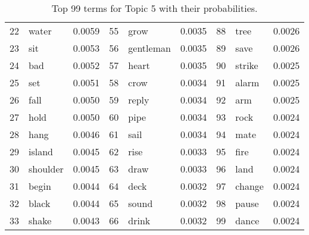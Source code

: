\begin{table}[ht]
\begin{tabular}{rlrrlrrlr}
  22 & water & 0.0059 & 55 & grow & 0.0035 & 88 & tree & 0.0026 \\ 
  23 & sit & 0.0053 & 56 & gentleman & 0.0035 & 89 & save & 0.0026 \\ 
  24 & bad & 0.0052 & 57 & heart & 0.0035 & 90 & strike & 0.0025 \\ 
  25 & set & 0.0051 & 58 & crow & 0.0034 & 91 & alarm & 0.0025 \\ 
  26 & fall & 0.0050 & 59 & reply & 0.0034 & 92 & arm & 0.0025 \\ 
  27 & hold & 0.0050 & 60 & pipe & 0.0034 & 93 & rock & 0.0024 \\ 
  28 & hang & 0.0046 & 61 & sail & 0.0034 & 94 & mate & 0.0024 \\ 
  29 & island & 0.0045 & 62 & rise & 0.0033 & 95 & fire & 0.0024 \\ 
  30 & shoulder & 0.0045 & 63 & draw & 0.0033 & 96 & land & 0.0024 \\ 
  31 & begin & 0.0044 & 64 & deck & 0.0032 & 97 & change & 0.0024 \\ 
  32 & black & 0.0044 & 65 & sound & 0.0032 & 98 & pause & 0.0024 \\ 
  33 & shake & 0.0043 & 66 & drink & 0.0032 & 99 & dance & 0.0024 \\ 
   \hline
\end{tabular}
\caption{\small{ Top 99 terms for Topic 5 with their probabilities.}} 
\label{topic_5_terms}
\end{table}
